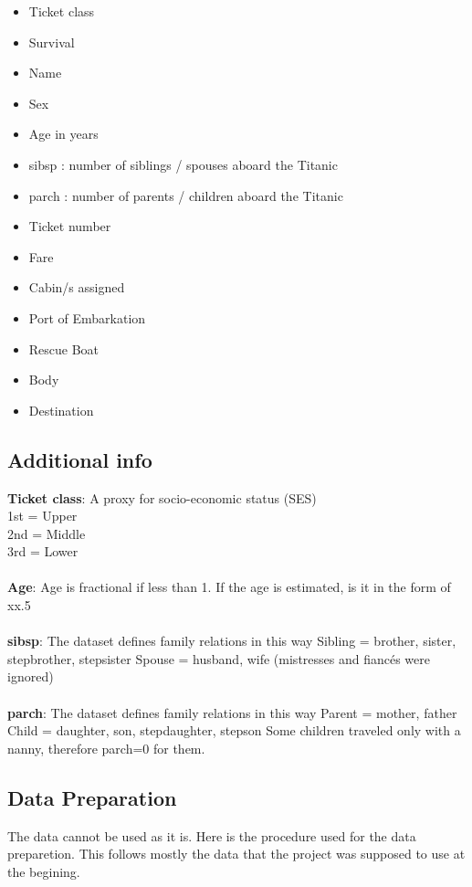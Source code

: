 \documentclass{article}
\begin{document}
\begin{itemize}
\item Ticket class
\item Survival 
\item Name
\item Sex
\item Age in years
\item sibsp : number of siblings / spouses aboard the Titanic
\item parch : number of parents / children aboard the Titanic
\item Ticket number	
\item Fare
\item Cabin/s assigned
\item Port of Embarkation	
\item Rescue Boat
\item Body
\item Destination
\end{itemize}

\subsection{Additional info}
\textbf{Ticket class}: A proxy for socio-economic status (SES)\\
1st = Upper\\
2nd = Middle\\
3rd = Lower\\
\\
\textbf{Age}: Age is fractional if less than 1. If the age is estimated, is it in the form of xx.5
\\\\
\textbf{sibsp}: The dataset defines family relations in this way
Sibling = brother, sister, stepbrother, stepsister
Spouse = husband, wife (mistresses and fiancés were ignored)
\\\\
\textbf{parch}: The dataset defines family relations in this way
Parent = mother, father
Child = daughter, son, stepdaughter, stepson
Some children traveled only with a nanny, therefore parch=0 for them.



\subsection{Data Preparation}
The data cannot be used as it is. Here is the procedure used for the data preparetion. This follows mostly the data that the project was supposed to use at the begining.
\end{document}
